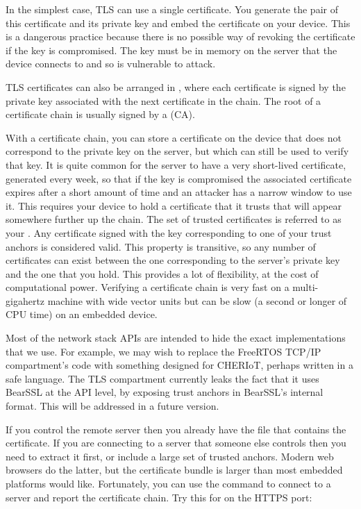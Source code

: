 In the simplest case, TLS can use a single certificate.
You generate the pair of this certificate and its private key and embed the certificate on your device.
This is a dangerous practice because there is no possible way of revoking the certificate if the key is compromised.
The key must be in memory on the server that the device connects to and so is vulnerable to attack.

TLS certificates can also be arranged in , where each certificate is signed by the private key associated with the next certificate in the chain.
The root of a certificate chain is usually signed by a  (CA).

With a certificate chain, you can store a certificate on the device that does not correspond to the private key on the server, but which can still be used to verify that key.
It is quite common for the server to have a very short-lived certificate, generated every week, so that if the key is compromised the associated certificate expires after a short amount of time and an attacker has a narrow window to use it.
This requires your device to hold a certificate that it trusts that will appear somewhere further up the chain.
The set of trusted certificates is referred to as your .
Any certificate signed with the key corresponding to one of your trust anchors is considered valid.
This property is transitive, so any number of certificates can exist between the one corresponding to the server's private key and the one that you hold.
This provides a lot of flexibility, at the cost of computational power.
Verifying a certificate chain is very fast on a multi-gigahertz machine with wide vector units but can be slow (a second or longer of CPU time) on an embedded device.

\begin{note}
Most of the network stack APIs are intended to hide the exact implementations that we use.
For example, we may wish to replace the FreeRTOS TCP/IP compartment's code with something designed for CHERIoT, perhaps written in a safe language.
The TLS compartment currently leaks the fact that it uses BearSSL at the API level, by exposing trust anchors in BearSSL's internal format.
This will be addressed in a future version.
\end{note}

If you control the remote server then you already have the  file that contains the certificate.
If you are connecting to a server that someone else controls then you need to extract it first, or include a large set of trusted anchors.
Modern web browsers do the latter, but the certificate bundle is larger than most embedded platforms would like.
Fortunately, you can use the  command to connect to a server and report the certificate chain.
Try this for  on the HTTPS port:


